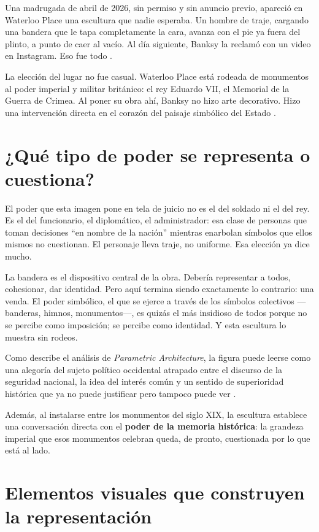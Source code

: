 \documentclass[12pt, a4paper]{article}
\begin{document}
Una madrugada de abril de 2026, sin permiso y sin anuncio previo, apareció en Waterloo Place una escultura que nadie esperaba. Un hombre de traje, cargando una bandera que le tapa completamente la cara, avanza con el pie ya fuera del plinto, a punto de caer al vacío. Al día siguiente, Banksy la reclamó con un video en Instagram. Eso fue todo \cite{npr2026}.

La elección del lugar no fue casual. Waterloo Place está rodeada de monumentos al poder imperial y militar británico: el rey Eduardo VII, el Memorial de la Guerra de Crimea. Al poner su obra ahí, Banksy no hizo arte decorativo. Hizo una intervención directa en el corazón del paisaje simbólico del Estado \cite{cbc2026}.

\section{¿Qué tipo de poder se representa o cuestiona?}

El poder que esta imagen pone en tela de juicio no es el del soldado ni el del rey. Es el del funcionario, el diplomático, el administrador: esa clase de personas que toman decisiones ``en nombre de la nación'' mientras enarbolan símbolos que ellos mismos no cuestionan. El personaje lleva traje, no uniforme. Esa elección ya dice mucho.

La bandera es el dispositivo central de la obra. Debería representar a todos, cohesionar, dar identidad. Pero aquí termina siendo exactamente lo contrario: una venda. El poder simbólico, el que se ejerce a través de los símbolos colectivos ---banderas, himnos, monumentos---, es quizás el más insidioso de todos porque no se percibe como imposición; se percibe como identidad. Y esta escultura lo muestra sin rodeos.

Como describe el análisis de \textit{Parametric Architecture}, la figura puede leerse como una alegoría del sujeto político occidental atrapado entre el discurso de la seguridad nacional, la idea del interés común y un sentido de superioridad histórica que ya no puede justificar pero tampoco puede ver \cite{parametric2026}.

Además, al instalarse entre los monumentos del siglo XIX, la escultura establece una conversación directa con el \textbf{poder de la memoria histórica}: la grandeza imperial que esos monumentos celebran queda, de pronto, cuestionada por lo que está al lado.

\section{Elementos visuales que construyen la representación}
\end{document}
